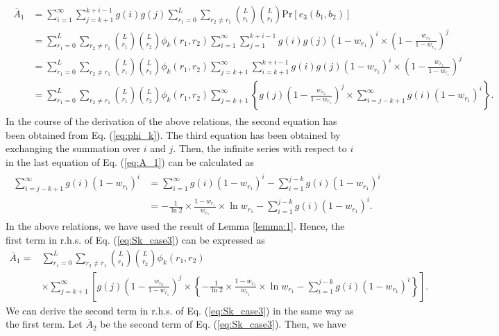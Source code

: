 \begin{align}\begin{split}\label{eq:A_1}
	\overline{A}_1
	&=\sum_{i=1}^{\infty}\sum_{j=k+1}^{k+i-1} g(i)g(j) \sum_{r_1=0}^{L} \sum_{r_2 \neq r_1} \binom{L}{r_1}\binom{L}{r_2}\mathrm{Pr}[e_3(b_1,b_2)] \\
	&=\sum_{r_1=0}^{L} \sum_{r_2 \neq r_1} \binom{L}{r_1}\binom{L}{r_2}\phi_k(r_1,r_2)
	\sum_{i=1}^{\infty} \sum_{j=1}^{k+i-1} g(i)g(j)(1-w_{r_1})^{i} \times \left(1-\frac{w_{r_2}}{1-w_{r_1}} \right)^{j} \\
	&=\sum_{r_1=0}^{L} \sum_{r_2 \neq r_1} \binom{L}{r_1}\binom{L}{r_2}\phi_k(r_1,r_2)
	\sum_{j=k+1}^{\infty} \sum_{i=k+1}^{k+i-1} g(i)g(j)(1-w_{r_1})^{i} \times \left(1-\frac{w_{r_2}}{1-w_{r_1}} \right)^{j} \\
	&=\sum_{r_1=0}^{L} \sum_{r_2 \neq r_1} \binom{L}{r_1}\binom{L}{r_2}\phi_k(r_1,r_2)
	\sum_{j=k+1}^{\infty} \left\{ g(j) \left(1-\frac{w_{r_2}}{1-w_{r_1}} \right)^{j} \times \sum_{i=j-k+1}^{\infty} g(i)(1-w_{r_1})^{i} \right\}.
\end{split}\end{align}
In the course of the derivation of the above relations, the second equation has been obtained from Eq. (\ref{eq:phi_k}). The third equation has been obtained by exchanging the summation over $i$ and $j$.
%
Then, the infinite series with respect to $i$ in the last equation of Eq. (\ref{eq:A_1}) can be calculated as
\begin{align}\begin{split}
	\sum_{i=j-k+1}^{\infty} g(i)(1-w_{r_1})^{i} 
	&= \sum_{i=1}^{\infty} g(i)(1-w_{r_1})^{i} - \sum_{i=1}^{j-k} g(i)(1-w_{r_1})^{i} \\
	&= -\frac{1}{\ln 2} \times \frac{1-w_{r_1}}{w_{r_1}} \times \ln w_{r_1} - \sum_{i=1}^{j-k} g(i)(1-w_{r_1})^{i}.
\end{split}\end{align}
In the above relations, we have used the result of Lemma \ref{lemma:1}.
Hence, the first term in r.h.s. of Eq. (\ref{eq:Sk_case3}) can be expressed as
\begin{align}
	\overline{A}_1 
	=& \sum_{r_1=0}^{L} \sum_{r_2 \neq r_1} \binom{L}{r_1}\binom{L}{r_2}\phi_k(r_1,r_2)\\
	&\times\sum_{j=k+1}^{\infty} \left[ g(j) \left(1-\frac{w_{r_2}}{1-w_{r_1}} \right)^{j} \times \left\{ -\frac{1}{\ln 2} \times \frac{1-w_{r_1}}{w_{r_1}} \times \ln w_{r_1} - \sum_{i=1}^{j-k} g(i)(1-w_{r_1})^{i} \right\} \right].
\end{align}
We can derive the second term in r.h.s. of Eq. (\ref{eq:Sk_case3}) in the same way as the first term. Let $\overline{A}_2$ be the second term of Eq. (\ref{eq:Sk_case3}). Then, we have

